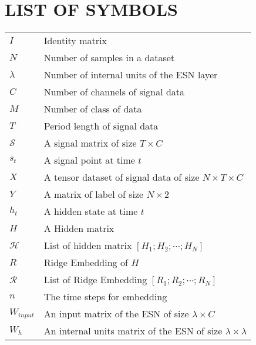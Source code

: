 \chapter*{LIST OF SYMBOLS}
\begin{flushleft}
\begin{tabular}{ll}

$I$ & Identity matrix\\

$N$ & Number of samples in a dataset \\

$\lambda$ & Number of internal units of the ESN layer \\

$C$ & Number of channels of signal data \\

$M$ & Number of class of data \\

$T$ & Period length of signal data\\

$\mathcal{S}$ & A signal matrix of size $T\times C$\\

$s_t$ & A signal point at time $t$\\

$X$ & A tensor dataset of signal data of size $N\times T\times C$\\

$Y$ & A matrix of label of size $N \times 2$\\

$h_t$ & A hidden state at time $t$\\

$H$ & A Hidden matrix\\

$\mathcal{H}$ & List of hidden matrix $[H_1;H_2;\cdots;H_N]$ \\

$R$ & Ridge Embedding of $H$\\

$\mathcal{R}$ & List of Ridge Embedding $[R_1;R_2;\cdots;R_N]$\\

$n$ & The time steps for embedding\\

$W_{input}$ & An input matrix of the ESN of size $\lambda\times C$\\

$W_{h}$ & An internal units matrix of the ESN of size $\lambda\times \lambda$\\


\end{tabular}
\end{flushleft}
